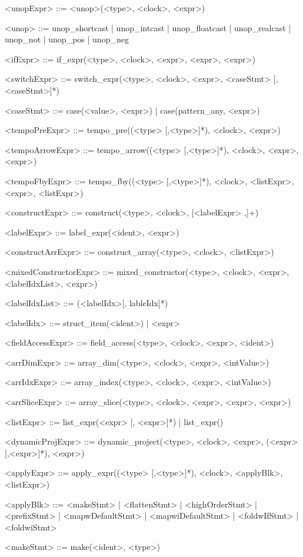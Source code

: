 \documentclass{article}
\begin{document}
\begin{grammar}
<unopExpr> ::= <unop>(<type>, <clock>, <expr>)

<unop> ::= unop_shortcast | unop_intcast | unop_floatcast |
           unop_realcast | unop_not | unop_pos | unop_neg

<ifExpr> ::= if_expr(<type>, <clock>, <expr>, <expr>, <expr>)

<switchExpr> ::= switch_expr(<type>, <clock>, <expr>, <caseStmt> [,<caseStmt>]*)

<caseStmt> ::= case(<value>, <expr>) | case(pattern_any, <expr>)

<tempoPreExpr> ::= tempo_pre((<type> [,<type>]*), <clock>, <expr>)

<tempoArrowExpr> ::= tempo_arrow((<type> [,<type>]*), <clock>, <expr>, <expr>)

<tempoFbyExpr> ::= tempo_fby((<type> [,<type>]*), <clock>, <listExpr>, <expr>, <listExpr>)

<constructExpr> ::= construct(<type>, <clock>, [<labelExpr> ,]+)

<labelExpr> ::= label_expr(<ident>, <expr>)

<constructArrExpr> ::= construct_array(<type>, <clock>, <listExpr>)

<mixedConstructorExpr> ::= mixed_constructor(<type>, <clock>, <expr>, <labelIdxList>, <expr>)

<labelIdxList> ::= (<labelIdx>[, lableIdx]*)

<labelIdx> ::= struct_item(<ident>) | <expr>

<fieldAccessExpr> ::= field_access(<type>, <clock>, <expr>, <ident>)

<arrDimExpr> ::= array_dim(<type>, <clock>, <expr>, <intValue>)

<arrIdxExpr> ::= array_index(<type>, <clock>, <expr>, <intValue>)

<arrSliceExpr> ::= array_slice(<type>, <clock>, <expr>, <expr>, <expr>)

<listExpr> ::= list_expr(<expr> [, <expr>]*) | list_expr()

<dynamicProjExpr> ::= dynamic_project(<type>, <clock>, <expr>, (<expr> [,<expr>]*), <expr>)

<applyExpr> ::= apply_expr((<type> [,<type>]*), <clock>, <applyBlk>, <listExpr>)

<applyBlk> ::= <makeStmt> | <flattenStmt> | <highOrderStmt> | <prefixStmt> |
               <mapwDefaultStmt> | <mapwiDefaultStmt> |
               <foldwIfStmt> | <foldwiStmt>

<makeStmt> ::= make(<ident>, <type>)


\end{grammar}
\end{document}
